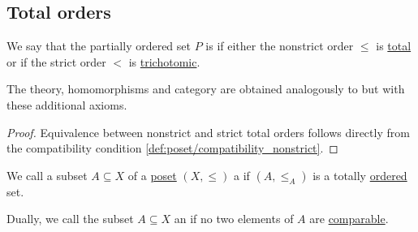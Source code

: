 \subsection{Total orders}\label{subsec:total_orders}

\begin{definition}\label{def:totally_ordered_set}
  We say that the partially ordered set \( P \) is  if either the nonstrict order \( \leq \) is \hyperref[def:binary_relation/total]{total} or if the strict order \( < \) is \hyperref[def:binary_relation/trichotomic]{trichotomic}.

  The theory, homomorphisms and category are obtained analogously to  but with these additional axioms.
\end{definition}
\begin{proof}
  Equivalence between nonstrict and strict total orders follows directly from the compatibility condition \eqref{def:poset/compatibility_nonstrict}.
\end{proof}

\begin{definition}\label{def:poset_chain}
  We call a subset \( A \subseteq X \) of a \hyperref[def:poset]{poset} \( (X, \leq) \) a  if \( (A, \leq_A) \) is a totally \hyperref[def:totally_ordered_set]{ordered} set.

  Dually, we call the subset \( A \subseteq X \) an  if no two elements of \( A \) are \hyperref[def:preordered_set/comparability]{comparable}.
\end{definition}

